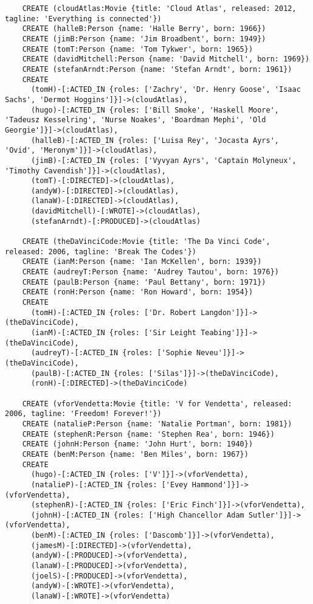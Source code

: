 \begin{lstlisting}
	CREATE (cloudAtlas:Movie {title: 'Cloud Atlas', released: 2012, tagline: 'Everything is connected'})
	CREATE (halleB:Person {name: 'Halle Berry', born: 1966})
	CREATE (jimB:Person {name: 'Jim Broadbent', born: 1949})
	CREATE (tomT:Person {name: 'Tom Tykwer', born: 1965})
	CREATE (davidMitchell:Person {name: 'David Mitchell', born: 1969})
	CREATE (stefanArndt:Person {name: 'Stefan Arndt', born: 1961})
	CREATE
	  (tomH)-[:ACTED_IN {roles: ['Zachry', 'Dr. Henry Goose', 'Isaac Sachs', 'Dermot Hoggins']}]->(cloudAtlas),
	  (hugo)-[:ACTED_IN {roles: ['Bill Smoke', 'Haskell Moore', 'Tadeusz Kesselring', 'Nurse Noakes', 'Boardman Mephi', 'Old Georgie']}]->(cloudAtlas),
	  (halleB)-[:ACTED_IN {roles: ['Luisa Rey', 'Jocasta Ayrs', 'Ovid', 'Meronym']}]->(cloudAtlas),
	  (jimB)-[:ACTED_IN {roles: ['Vyvyan Ayrs', 'Captain Molyneux', 'Timothy Cavendish']}]->(cloudAtlas),
	  (tomT)-[:DIRECTED]->(cloudAtlas),
	  (andyW)-[:DIRECTED]->(cloudAtlas),
	  (lanaW)-[:DIRECTED]->(cloudAtlas),
	  (davidMitchell)-[:WROTE]->(cloudAtlas),
	  (stefanArndt)-[:PRODUCED]->(cloudAtlas)
	
	CREATE (theDaVinciCode:Movie {title: 'The Da Vinci Code', released: 2006, tagline: 'Break The Codes'})
	CREATE (ianM:Person {name: 'Ian McKellen', born: 1939})
	CREATE (audreyT:Person {name: 'Audrey Tautou', born: 1976})
	CREATE (paulB:Person {name: 'Paul Bettany', born: 1971})
	CREATE (ronH:Person {name: 'Ron Howard', born: 1954})
	CREATE
	  (tomH)-[:ACTED_IN {roles: ['Dr. Robert Langdon']}]->(theDaVinciCode),
	  (ianM)-[:ACTED_IN {roles: ['Sir Leight Teabing']}]->(theDaVinciCode),
	  (audreyT)-[:ACTED_IN {roles: ['Sophie Neveu']}]->(theDaVinciCode),
	  (paulB)-[:ACTED_IN {roles: ['Silas']}]->(theDaVinciCode),
	  (ronH)-[:DIRECTED]->(theDaVinciCode)
	
	CREATE (vforVendetta:Movie {title: 'V for Vendetta', released: 2006, tagline: 'Freedom! Forever!'})
	CREATE (natalieP:Person {name: 'Natalie Portman', born: 1981})
	CREATE (stephenR:Person {name: 'Stephen Rea', born: 1946})
	CREATE (johnH:Person {name: 'John Hurt', born: 1940})
	CREATE (benM:Person {name: 'Ben Miles', born: 1967})
	CREATE
	  (hugo)-[:ACTED_IN {roles: ['V']}]->(vforVendetta),
	  (natalieP)-[:ACTED_IN {roles: ['Evey Hammond']}]->(vforVendetta),
	  (stephenR)-[:ACTED_IN {roles: ['Eric Finch']}]->(vforVendetta),
	  (johnH)-[:ACTED_IN {roles: ['High Chancellor Adam Sutler']}]->(vforVendetta),
	  (benM)-[:ACTED_IN {roles: ['Dascomb']}]->(vforVendetta),
	  (jamesM)-[:DIRECTED]->(vforVendetta),
	  (andyW)-[:PRODUCED]->(vforVendetta),
	  (lanaW)-[:PRODUCED]->(vforVendetta),
	  (joelS)-[:PRODUCED]->(vforVendetta),
	  (andyW)-[:WROTE]->(vforVendetta),
	  (lanaW)-[:WROTE]->(vforVendetta)
	

\end{lstlisting}
